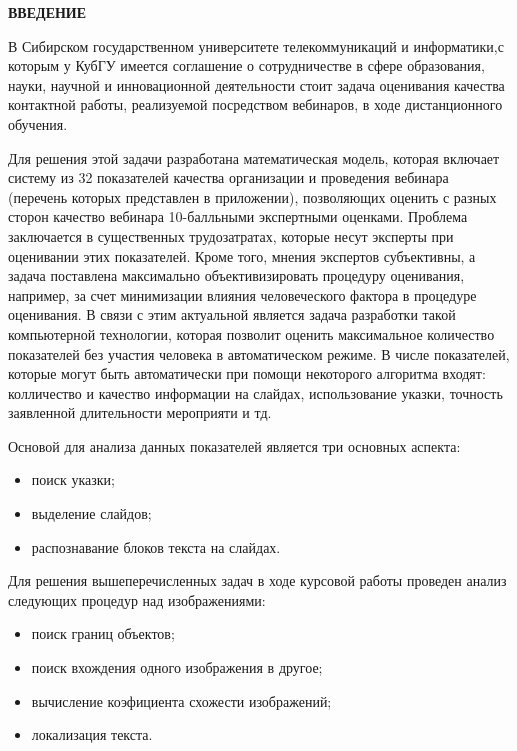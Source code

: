\documentclass[oneside,final,14pt]{extreport}
\begin{document}
\tableofcontents
\newpage
\begin{center}
\bfseries ВВЕДЕНИЕ
\end{center}

В Сибирском государственном университете телекоммуникаций и информатики,с которым у КубГУ имеется соглашение о сотрудничестве в сфере образования, науки, научной и инновационной деятельности стоит задача оценивания
качества контактной работы, реализуемой посредством вебинаров, в ходе дистанционного обучения. 

Для решения этой задачи разработана математическая модель, которая включает систему из 32 показателей качества организации и проведения вебинара (перечень которых представлен в приложении), позволяющих оценить с разных сторон  качество вебинара 10-балльными экспертными оценками. Проблема заключается в существенных трудозатратах, которые несут эксперты при оценивании этих показателей. Кроме того, мнения экспертов субъективны, а задача поставлена максимально объективизировать процедуру оценивания, например, за счет минимизации влияния человеческого фактора в процедуре оценивания. В связи с этим актуальной является  задача разработки такой компьютерной технологии, которая позволит оценить максимальное количество показателей без участия человека в автоматическом режиме. В числе показателей, которые могут быть автоматически при помощи некоторого алгоритма входят: колличество и качество информации на слайдах, использование указки, точность заявленной длительности мероприяти и тд.

Основой для анализа данных показателей является три основных аспекта:
\begin{itemize}
\item поиск указки;
\item выделение слайдов;
\item распознавание блоков текста на слайдах.
\end{itemize} 

Для решения вышеперечисленных задач в ходе курсовой работы проведен анализ следующих процедур над изображениями:

\begin{itemize}
\item поиск границ объектов;
\item поиск вхождения одного изображения в другое;
\item вычисление коэфициента схожести изображений;
\item локализация текста.
\end{itemize}
\end{document}
